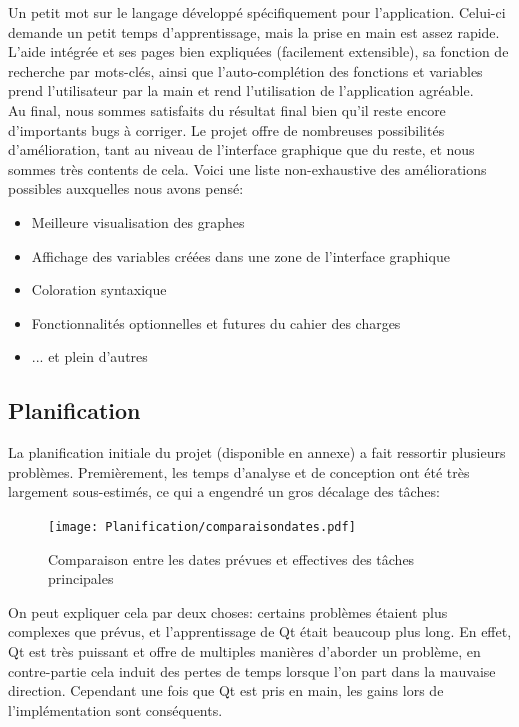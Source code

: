 \documentclass[french]{article}
\begin{document}
		Un petit mot sur le langage développé spécifiquement pour l'application. Celui-ci demande un petit temps d'apprentissage, mais la prise en main est assez rapide. L'aide intégrée et ses pages bien expliquées (facilement extensible), sa fonction de recherche par mots-clés, ainsi que l'auto-complétion des fonctions et variables prend l'utilisateur par la main et rend l'utilisation de l'application agréable.\\  
		
		Au final, nous sommes satisfaits du résultat final bien qu'il reste encore d'importants bugs à corriger. Le projet offre de nombreuses possibilités d'amélioration, tant au niveau de l'interface graphique que du reste, et nous sommes très contents de cela. Voici une liste non-exhaustive des améliorations possibles auxquelles nous avons pensé:
		\begin{itemize}
			\item Meilleure visualisation des graphes
			\item Affichage des variables créées dans une zone de l'interface graphique
			\item Coloration syntaxique
			\item Fonctionnalités optionnelles et futures du cahier des charges
			\item ... et plein d'autres
		\end{itemize}
		
		\subsection{Planification}
		
		La planification initiale du projet (disponible en annexe) a fait ressortir plusieurs problèmes. Premièrement, les temps d'analyse et de conception ont été très largement sous-estimés, ce qui a engendré un gros décalage des tâches:
		\begin{figure}[H]
			\texttt{[image: Planification/comparaisondates.pdf]}
			\caption{Comparaison entre les dates prévues et effectives des tâches principales}
			\label{fig:comparaisondates}
		\end{figure}
		On peut expliquer cela par deux choses: certains problèmes étaient plus complexes que prévus, et l'apprentissage de Qt était beaucoup plus long. En effet, Qt est très puissant et offre de multiples manières d'aborder un problème, en contre-partie cela induit des pertes de temps lorsque l'on part dans la mauvaise direction. Cependant une fois que Qt est pris en main, les gains lors de l'implémentation sont conséquents.\\ 
		
\end{document}
